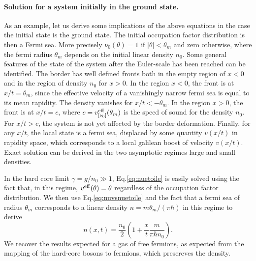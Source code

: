 \documentclass[submission, Phys]{SciPost}
\begin{document}
\paragraph{Solution for a system initially in the ground state.}
As an example, let us derive some implications of the above equations in the case the  initial state is the ground 
state. The initial occupation factor distribution is then a Fermi sea. More precisely $\nu_0(\theta)=1$ if $|\theta| < \theta_m$ and zero otherwise, where the fermi radius $\theta_m$ depends on the initial linear density $n_0$. 
Some general features of the state of the system after the 
Euler-scale has been reached can be identified. The border has well defined  
fronts both in the empty region of $x<0$ and in the region of density
$n_0$ for $x>0$. In the region $x<0$, the front is at 
$x/t =\theta_m$, since the effective velocity of a vanishingly narrow fermi sea is equal to its mean rapidity. The density vanishes for $x/t<-\theta_m$. In the region $x>0$, the front is at $x/t = c$, where $c=v^{\rm eff}_{[\nu_0]}(\theta_m)$ is the speed of sound for the density $n_0$. For $x/t>c$, the system is not yet affected by the border deformation.  Finally, for any $x/t$, the local state is a  fermi sea, displaced by some quantity $v(x/t)$ in rapidity space, which corresponds to a local galilean boost of velocity $v(x/t)$.
Exact solution can be derived  in the two asymptotic regimes
large and small densities. 

In the hard core limit $\gamma=g/n_0\gg 1$, Eq.\eqref{eq:nuetoile} is easily solved using the fact that, in this regime, $v^{\rm eff} (\theta)=\theta$ 
regardless of the occupation factor distribution. We then use Eq.\eqref{eq:nuvsnuetoile} and the fact that  a fermi sea of radius $\theta_m$ corresponds to a linear density $n=m\theta_m/(\pi\hbar)$ in this regime to derive 
\begin{equation}
    n(x,t)=\frac{n_0}{2} \left ( 1 + \frac{x}{t} \frac{m}{\pi \hbar n_0} \right ).
\end{equation}
We recover the results expected for a gas of free fermions, as expected from the mapping of the hard-core bosons to fermions, which presereves the density\cite{girardeau_relationship_1960}. 
\end{document}
